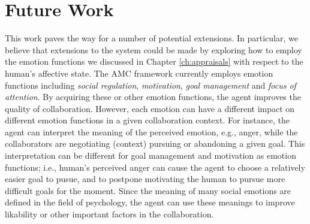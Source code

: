 \documentclass[12pt]{report}
\begin{document}

\section{Future Work}

This work paves the way for a number of potential extensions. In
particular, we believe that extensions to the system could be made by exploring
how to employ the emotion functions we discussed in Chapter \ref{ch:appraisals}
with respect to the human's affective state. The AMC framework currently employs
emotion functions including \textit{social regulation}, \textit{motivation},
\textit{goal management} and \textit{focus of attention}. By acquiring these or
other emotion functions, the agent improves the quality of collaboration.
However, each emotion can have a different impact on different emotion functions
in a given collaboration context. For instance, the agent can interpret the
meaning of the perceived emotion, e.g., anger, while the collaborators are
negotiating (context) pursuing or abandoning a given goal. This interpretation
can be different for goal management and motivation as emotion functions; i.e.,
human's perceived anger can cause the agent to choose a relatively easier goal
to pusue, and to postpone motivating the human to pursue more difficult goals
for the moment. Since the meaning of many social emotions are defined in the
field of psychology, the agent can use these meanings to improve likability or
other important factors in the collaboration.
\end{document}
